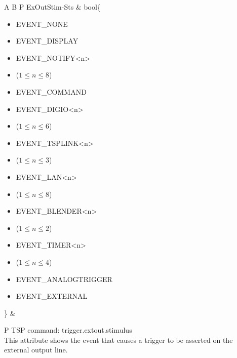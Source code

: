\documentclass[openany]{article}
\begin{document}
\begin{longtable}{A B P}
		ExOutStim-Sts & bool\{\begin{itemize}[noitemsep]
					\small
					\item[] EVENT\_NONE
					\item[] EVENT\_DISPLAY
					\item[] EVENT\_NOTIFY\textless n\textgreater
					\item[] ($1\leq n\leq 8$)
					\item[] EVENT\_COMMAND
					\item[] EVENT\_DIGIO\textless n\textgreater
					\item[] ($1\leq n\leq 6$)
					\item[] EVENT\_TSPLINK\textless n\textgreater
					\item[] ($1\leq n\leq 3$)
					\item[] EVENT\_LAN\textless n\textgreater
					\item[] ($1\leq n\leq 8$)
					\item[] EVENT\_BLENDER\textless n\textgreater 
					\item[] ($1\leq n\leq 2$)
					\item[] EVENT\_TIMER\textless n\textgreater
					\item[] ($1\leq n\leq 4$)
					\item[] EVENT\_ANALOGTRIGGER
					\item[] EVENT\_EXTERNAL
				\end{itemize}\} & 
				\begin{tabular}{P}
					TSP command: trigger.extout.stimulus \\
					This attribute shows the event that causes a trigger to be asserted on the external output line.
				\end{tabular} \\ \hline
	\end{longtable}
\end{document}
